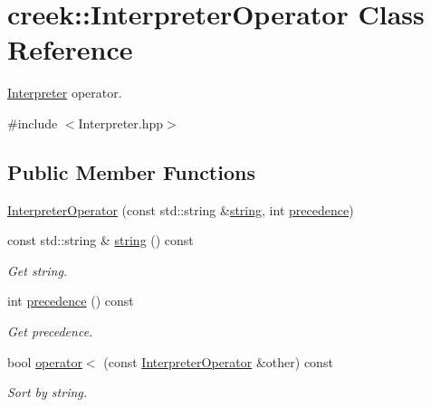 \hypertarget{classcreek_1_1_interpreter_operator}{}\section{creek\+:\+:Interpreter\+Operator Class Reference}
\label{classcreek_1_1_interpreter_operator}


\hyperlink{classcreek_1_1_interpreter}{Interpreter} operator.  




{\ttfamily \#include $<$Interpreter.\+hpp$>$}

\subsection*{Public Member Functions}
\begin{DoxyCompactItemize}
\item 
\hyperlink{classcreek_1_1_interpreter_operator_a5909d362fc74eda68217ed96a3d79560}{Interpreter\+Operator} (const std\+::string \&\hyperlink{classcreek_1_1_interpreter_operator_a6afc7d7eb07e2dd8989fac5b330a8493}{string}, int \hyperlink{classcreek_1_1_interpreter_operator_a8e599ec6304b1357d5da90daa577dff9}{precedence})
\item 
const std\+::string \& \hyperlink{classcreek_1_1_interpreter_operator_a6afc7d7eb07e2dd8989fac5b330a8493}{string} () const \hypertarget{classcreek_1_1_interpreter_operator_a6afc7d7eb07e2dd8989fac5b330a8493}{}\label{classcreek_1_1_interpreter_operator_a6afc7d7eb07e2dd8989fac5b330a8493}

\begin{DoxyCompactList}\small\item\em Get string. \end{DoxyCompactList}\item 
int \hyperlink{classcreek_1_1_interpreter_operator_a8e599ec6304b1357d5da90daa577dff9}{precedence} () const \hypertarget{classcreek_1_1_interpreter_operator_a8e599ec6304b1357d5da90daa577dff9}{}\label{classcreek_1_1_interpreter_operator_a8e599ec6304b1357d5da90daa577dff9}

\begin{DoxyCompactList}\small\item\em Get precedence. \end{DoxyCompactList}\item 
bool \hyperlink{classcreek_1_1_interpreter_operator_a6b70cef750dfc39fada8ed0c06310a6b}{operator$<$} (const \hyperlink{classcreek_1_1_interpreter_operator}{Interpreter\+Operator} \&other) const \hypertarget{classcreek_1_1_interpreter_operator_a6b70cef750dfc39fada8ed0c06310a6b}{}\label{classcreek_1_1_interpreter_operator_a6b70cef750dfc39fada8ed0c06310a6b}

\begin{DoxyCompactList}\small\item\em Sort by string. \end{DoxyCompactList}\end{DoxyCompactItemize}


